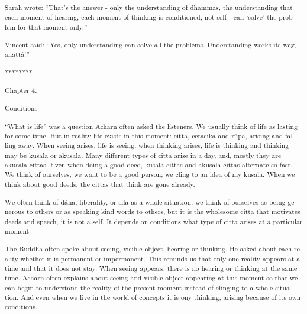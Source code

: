 \textsuperscript{\textdutch{Sarah wrote:
``}\textenglish[variant=american]{That}\textdutch{'}\textenglish[variant=american]{s
the answer - only the understanding of dhammas, the understanding that
each moment of hearing, each moment of thinking is conditioned, not self
- can }\textdutch{`}solve\textdutch{'}\textenglish[variant=american]{
the problem for that moment only.}\textdutch{''}}

\textsuperscript{\textdutch{Vincent said:
``}\textenglish[variant=american]{Yes, only understanding can solve all
the problems. Understanding}\textdutch{
}\textenglish[variant=american]{works its way,
anatt}\textdutch{å}!\textdutch{''}}

\textsuperscript{\textdutch{********}}

\textsuperscript{\textdutch{Chapter 4.}}

\textsuperscript{\textdutch{Conditions}}

\textsuperscript{``\textdutch{What is life'' was a question Acharn often
asked the listeners. We usually think of life as lasting for some time.
But in reality life exists in this moment: citta, cetasika and rúpa,
arising and falling away. When seeing arises, life is seeing, when
thinking arises, life is thinking and thinking may be kusala or akusala.
M}\textenglish[variant=american]{any different types of citta
aris}\textdutch{e}\textenglish[variant=american]{ in a day, and, mostly
}\textdutch{they are }\textenglish[variant=american]{akusala cittas.
Even when doing a good deed, kusala cittas and akusala cittas alternate
so fast. }\textdutch{We think of ourselves, we want to be a good person;
we cling to an idea of my kusala. }\textenglish[variant=american]{When
we think }\textdutch{about good deeds, the cittas that
think}\textenglish[variant=american]{ are gone already. }}

\textsuperscript{\textdutch{W}\textenglish[variant=american]{e often
think of }\textdutch{dåna, liberality, or síla as
}\textenglish[variant=american]{a whole situation}\textdutch{, we think
of ourselves as being generous to others or as speaking kind words to
others, but it is the wholesome citta that motivates deeds and speech,
it is not a self. It depends on conditions what type of citta arises at
a particular moment. }}

\textsuperscript{\textdutch{The Buddha often spoke about seeing, visible
object, hearing or thinking. He asked about each reality whether it is
permanent or impermanent. This reminds us that only one reality appears
at a time and that it does not stay. When seeing appears, there is no
hearing or thinking at the same time. Acharn often explains about seeing
and visible object appearing at this moment so that we can begin to
understand the reality of the present moment instead of clinging to a
whole situation. And even when we live in the world of concepts it is
ony thinking, arising because of its own conditions. }}

